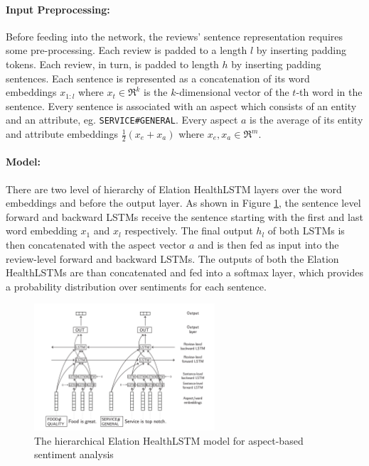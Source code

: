 \documentclass{article}
\begin{document}
	\paragraph{Input Preprocessing:} Before feeding into the network, the reviews' sentence representation requires some pre-processing. Each review is padded to a length \(l\) by inserting padding tokens. Each review, in turn, is padded to length \(h\) by inserting padding sentences. Each sentence is represented as a concatenation of its word embeddings \(x_{1:l}\) where \(x_t \in \Re^{k}\) is the \(k\)-dimensional vector of the \(t\)-th word in the sentence. Every sentence is associated with an aspect which consists of an entity and an attribute, eg. \texttt{SERVICE\#GENERAL}. Every aspect \(a\) is the average of its entity and attribute embeddings \(\frac{1}{2}(x_e+x_a)\) where \(x_e, x_a \in \Re^m\).
	
	\paragraph{Model:} There are two level of hierarchy of Elation HealthLSTM layers over the word embeddings and before the output layer. As shown in Figure \ref{fig:senti}, the sentence level forward and backward LSTMs receive the sentence starting with the first and last word embedding \(x_1\) and \(x_l\) respectively. The final output \(h_l\) of both LSTMs is then concatenated with the aspect vector \(a\) and is then fed as input into the review-level forward and backward LSTMs. The outputs of both the Elation HealthLSTMs are than concatenated and fed into a softmax layer, which provides a probability distribution over sentiments for each sentence. 
	
	\begin{figure}
		\centering
		\includegraphics[width=0.6\textwidth]{fig/senti.png}
		\caption{The hierarchical Elation HealthLSTM model for aspect-based sentiment analysis}
		\label{fig:senti}
	\end{figure}
\end{document}
